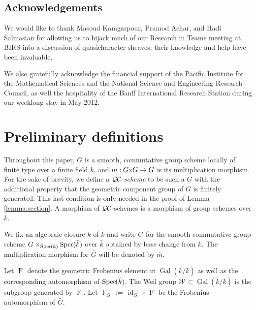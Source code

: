 \documentclass{amsart}
\theoremstyle{plain}
\theoremstyle{definition}
\theoremstyle{remark}
\newcommand{\bFq}{\bar{k}}
\newcommand{\Fq}{k}
\newcommand{\Weil}[1]{\mathcal{W}_{#1}}
\DeclareMathOperator{\Gal}{Gal}
\newcommand{\Frob}[1]{\operatorname{F}_{#1}}
\DeclareMathOperator{\id}{id}
\newcommand{\Spec}[1]{{\operatorname{Spec}\hskip-1pt( #1 )}}
\newcommand{\ceq}{{\, :=\, }}
\newcommand{\QC}{{\mathcal{Q\hskip-0.8pt C}}}
\newcommand{\bm}{\bar{m}}
\newcommand{\bG}{\bar{G}}
\newcommand{\tight}[3]{\hspace{-#1pt}{#2}\hspace{-#3pt}}
\newcommand{\GxG}{\text{$G \tight{1}{\times}{1} G$}}
\begin{document}
\subsection*{Acknowledgements}
We would like to thank Masoud Kamgarpour, Pramod Achar, and Hadi Salmasian
for allowing us to hijack much of our Research in Teams meeting at BIRS into a discussion of
quasicharacter sheaves; their knowledge and help have been invaluable. 

We also gratefully acknowledge the financial support of the Pacific Institute for the Mathematical Sciences
and the National Science and Engineering Research Council,
as well the hospitality of the Banff International Research Station during our weeklong stay in May 2012.


\tableofcontents

\section{Preliminary definitions}\label{sec:QCschemes}

Throughout this paper, $G$ is a smooth, commutative group scheme locally of finite type
over a finite field $\Fq$, and $m : \GxG\to G$ is its multiplication morphism.  For the sake of brevity, we
define a \emph{$\QC$-scheme} to be such a $G$ with the additional property that the
geometric component group of $G$ is finitely generated.  This last condition is only
needed in the proof of Lemma \ref{lemma:section}.  A morphism of $\QC$-schemes is a morphism
of group schemes over $\Fq$.

We fix an algebraic closure $\bFq$ of $\Fq$ and write $\bG$ for the
smooth commutative group scheme $G \times_{\Spec{\Fq}} \Spec{\bFq}$ over $\bFq$
obtained by base change from $k$. The multiplication morphism for $\bG$ will be denoted by $\bm$. 

Let $\Frob{}$ denote the geometric Frobenius element in $\Gal(\bFq/\Fq)$ as
well as the corresponding automorphism of $\Spec{\bFq}$. The Weil group
$\Weil{}\subset \Gal(\bFq/\Fq)$ is the subgroup generated by $\Frob{}$.
Let $\Frob{G} \ceq \id_{G} \times \Frob{}$ be the Frobenius automorphism of $\bG$.
\end{document}
